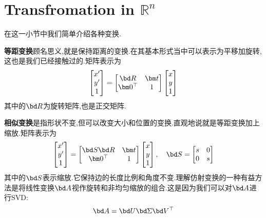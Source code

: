 \section{Transfromation in $\mathbb R^n$\label{transformation}}
在这一小节中我们简单介绍各种变换.

\textbf{等距变换}顾名思义,就是保持距离的变换.在其基本形式当中可以表示为平移加旋转,这也是我们已经接触过的.矩阵表示为
\begin{equation}
	\begin{bmatrix}
		x^\prime
		\\
		y^\prime
		\\
		1
	\end{bmatrix} = 
	\begin{bmatrix}
		\bd R & \bm t
		\\
		\bm 0^\top & 1
	\end{bmatrix}
	\begin{bmatrix}
		x
		\\
		y\\
		1
	\end{bmatrix}
\end{equation}
其中的$\bd R$为旋转矩阵,也是正交矩阵.

\textbf{相似变换}是指形状不变,但可以改变大小和位置的变换.直观地说就是等距变换加上缩放.矩阵表示为
\begin{equation}
	\begin{bmatrix}
		x^\prime
		\\
		y^\prime
		\\
		1
	\end{bmatrix} = 
	\begin{bmatrix}
		\bd S \bd R & \bm t
		\\
		\bm 0^\top & 1
	\end{bmatrix}
	\begin{bmatrix}
		x
		\\
		y\\
		1
	\end{bmatrix}, \quad \bd S = 
	\begin{bmatrix}
		s & 0
		\\ 
		0 & s
	\end{bmatrix}
\end{equation}
其中的$\bd S$表示缩放.它保持边的长度比例和角度不变.理解仿射变换的一种有益方法是将线性变换$\bd A$视作旋转和非均匀缩放的组合.这是因为我们可以对$\bd A$进行SVD:
\begin{equation}
	\bd A = \bd U \bd \Sigma \bd V^\top
\end{equation}

